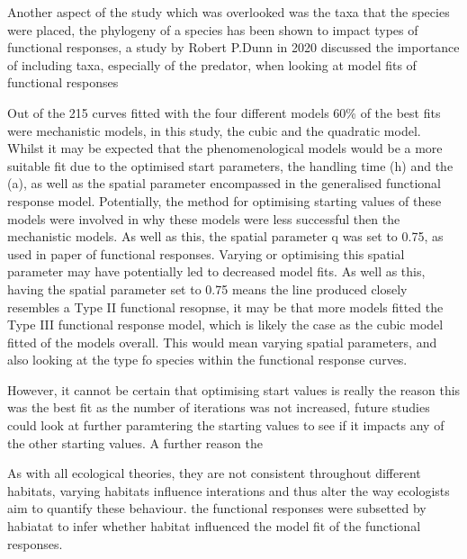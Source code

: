 \documentclass[11pt]{article}
\begin{document}
Another aspect of the study which was overlooked was the taxa that the species were placed, the phylogeny of a species has been shown to impact types of functional responses, a study by Robert P.Dunn in 2020 discussed the importance of including taxa, especially of the predator, when looking at model fits of functional responses



Out of the 215 curves fitted with the four different models 60\% of the best fits were mechanistic models, in this study, the cubic and the quadratic model. Whilst it may be expected that the phenomenological models would be a more suitable fit due  to the optimised start parameters, the handling time (h) and the            (a), as well as the spatial parameter encompassed in the generalised functional response model. Potentially, the method for optimising starting values of these models were involved in why these models were less successful then the mechanistic models. As well as this, the spatial parameter q was set to 0.75, as used in \cite{Pawar2012} paper of functional responses. Varying or optimising this spatial parameter may have potentially led to decreased model fits. As well as this, having the spatial parameter set to 0.75 means the line produced closely resembles a Type II functional resopnse, it may be that more models fitted the Type III functional response model, which is likely the case as the cubic model fitted           of the models overall. This would mean varying spatial parameters, and also looking at the type fo species within the functional response curves. 


However, it cannot be certain that optimising start values is really the reason this was the best fit as the number of iterations was not increased, future studies could look at further paramtering the starting values to see if it impacts any of the other starting values. A further reason the 

As with all ecological theories, they are not consistent throughout different habitats, varying habitats influence interations and thus alter the way ecologists aim to quantify these behaviour. the functional responses were subsetted by habiatat to infer whether habitat influenced the model fit of the functional responses. 

	
\newpage


\vspace*{1\baselineskip}
\printbibliography 


\newpage
\end{document}

